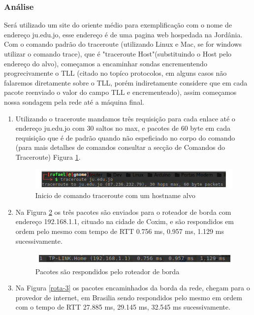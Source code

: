 \documentclass[
	article,			%
	11pt,				%
	oneside,			%
	a4paper,			%
	section=TITLE,		%
	english,			%
	brazil,				%
	sumario=tradicional
	]{abntex2}
\begin{document}
\subsubsection{Análise}
 Será utilizado um site do oriente médio para exemplificação com o nome de endereço ju.edu.jo, esse endereço é de uma pagina web hospedada na Jordânia.
 Com o comando padrão do traceroute (utilizando Linux e Mac, se for  windows utilizar o comando trace), que é "traceroute Host"(substituindo o Host pelo endereço do alvo), começamos a encaminhar sondas encrementendo progrecivamente o TLL (citado no topíco protocolos, em alguns casos não falaremos diretamente sobre o TLL, porém indiretamente considere que em cada pacote reenviado o valor do campo TLL e encrementeado), assim começamos nossa sondagem pela rede até a máquina final. 
 \begin{enumerate}
 	\item
 	Utilizando o traceroute mandamos três requisição para cada enlace até o endereço ju.edu.jo com 30 saltos no max, e pacotes de 60 byte em cada requisição que é de padrão quando não espeficiado no corpo do comando (para mais detalhes de comandos consultar a secção de Comandos do Traceroute) Figura \ref{rota-1}.
 		\begin{figure}[H]
	 		\centering
	 		\includegraphics[scale=0.65]{./rota-1.png}
	 		\caption{Inicio de comando traceroute com um hostname alvo}
	 		\label{rota-1}
	 	\end{figure}
 	
 	\item
 	Na Figura \ref{rota-2} os três pacotes são enviados para o roteador de borda com endereço 192.168.1.1, cituado na cidade de Coxim, e são respondidos em ordem pelo mesmo com tempo de RTT 0.756 ms, 0.957 ms, 1.129 ms sucessivamente.
 	\begin{figure}[H]
 		\centering
 		\includegraphics[scale=0.7]{./rota-2.png}
 		\caption{Pacotes são respondidos pelo roteador de borda}
 		\label{rota-2}
 	\end{figure}
 	
 	\item
 	Na Figura \ref{rota-3} os pacotes encaminhados da borda da rede, chegam para o provedor de internet, em Brasilia sendo respondidos pelo mesmo em ordem com o tempo de RTT 27.885 ms, 29.145 ms, 32.545 ms sucessivamente.	
 	

\end{enumerate}
\end{document}
